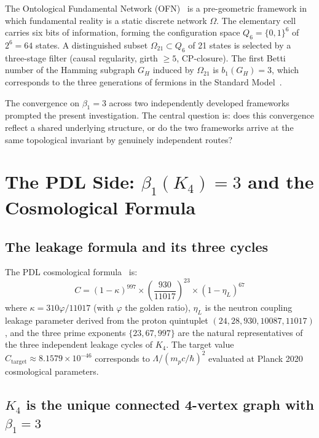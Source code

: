 \documentclass[11pt,a4paper]{article}
\begin{document}
The Ontological Fundamental Network (OFN)~\cite{Evdokimov_OFN_2026, Evdokimov_CWS_2026} is a pre-geometric framework in which fundamental reality is a static discrete network $\Omega$. The elementary cell carries six bits of information, forming the configuration space $Q_6 = \{0,1\}^6$ of $2^6 = 64$ states. A distinguished subset $\Omega_{21} \subset Q_6$ of 21 states is selected by a three-stage filter (causal regularity, girth $\geq 5$, CP-closure). The first Betti number of the Hamming subgraph $G_H$ induced by $\Omega_{21}$ is $b_1(G_H) = 3$, which corresponds to the three generations of fermions in the Standard Model~\cite{Evdokimov_CWS_2026}.

The convergence on $\beta_1 = 3$ across two independently developed frameworks prompted the present investigation. The central question is: does this convergence reflect a shared underlying structure, or do the two frameworks arrive at the same topological invariant by genuinely independent routes?

\section{The PDL Side: \texorpdfstring{$\beta_1(K_4) = 3$}{beta1(K4)=3} and the Cosmological Formula}
\label{sec:pdl}

\subsection{The leakage formula and its three cycles}

The PDL cosmological formula~\cite{Laubscher_D51_2026, Laubscher_D52_2026, Laubscher_D53_2026} is:
\begin{equation}
C = (1-\kappa)^{997} \times \left(\frac{930}{11017}\right)^{23} \times (1-\eta_L)^{67}
\label{eq:C}
\end{equation}
where $\kappa = 310\varphi/11017$ (with $\varphi$ the golden ratio), $\eta_L$ is the neutron coupling leakage parameter derived from the proton quintuplet $(24, 28, 930, 10087, 11017)$, and the three prime exponents $\{23, 67, 997\}$ are the natural representatives of the three independent leakage cycles of $K_4$. The target value $C_{\mathrm{target}} \approx 8.1579 \times 10^{-46}$ corresponds to $\Lambda / (m_p c/\hbar)^2$ evaluated at Planck 2020 cosmological parameters.

\subsection{\texorpdfstring{$K_4$ is the unique connected 4-vertex graph with $\beta_1 = 3$}{K4 is the unique connected 4-vertex graph with beta1 = 3}}
\end{document}

